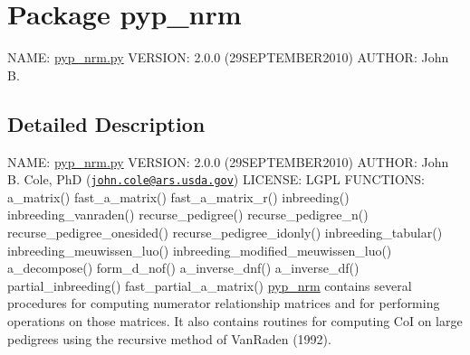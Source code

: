 \hypertarget{namespacepyp__nrm}{
\section{Package pyp\_\-nrm}
\label{namespacepyp__nrm}
}


NAME: \hyperlink{pyp__nrm_8py_source}{pyp\_\-nrm.py} VERSION: 2.0.0 (29SEPTEMBER2010) AUTHOR: John B.  




\subsection{Detailed Description}
NAME: \hyperlink{pyp__nrm_8py_source}{pyp\_\-nrm.py} VERSION: 2.0.0 (29SEPTEMBER2010) AUTHOR: John B. Cole, PhD (\href{mailto:john.cole@ars.usda.gov}{\tt john.cole@ars.usda.gov}) LICENSE: LGPL FUNCTIONS: a\_\-matrix() fast\_\-a\_\-matrix() fast\_\-a\_\-matrix\_\-r() inbreeding() inbreeding\_\-vanraden() recurse\_\-pedigree() recurse\_\-pedigree\_\-n() recurse\_\-pedigree\_\-onesided() recurse\_\-pedigree\_\-idonly() inbreeding\_\-tabular() inbreeding\_\-meuwissen\_\-luo() inbreeding\_\-modified\_\-meuwissen\_\-luo() a\_\-decompose() form\_\-d\_\-nof() a\_\-inverse\_\-dnf() a\_\-inverse\_\-df() partial\_\-inbreeding() fast\_\-partial\_\-a\_\-matrix() \hyperlink{namespacepyp__nrm}{pyp\_\-nrm} contains several procedures for computing numerator relationship matrices and for performing operations on those matrices. It also contains routines for computing CoI on large pedigrees using the recursive method of VanRaden (1992). 